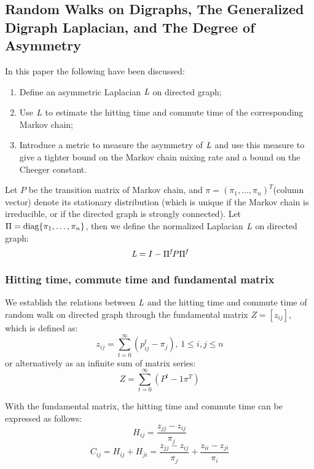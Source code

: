 \documentclass[twoside]{article}
\theoremstyle{definition}
\theoremstyle{definition}
\theoremstyle{remark}
\def\diag{{\rm diag}}
\begin{document}
\subsection{Random Walks on Digraphs, The Generalized Digraph Laplacian, and
The Degree of Asymmetry}
In this paper the following have been discussed:
\begin{enumerate}
  \item Define an asymmetric Laplacian $\emph{L}$ on directed graph;
  \item Use $\emph{L}$ to estimate the hitting time and commute time of the corresponding Markov chain;
  \item Introduce a metric to measure the asymmetry of $\emph{L}$ and use this measure to give a tighter bound on the Markov chain mixing rate and a bound on the Cheeger constant.
\end{enumerate}

Let $P$ be the transition matrix of Markov chain, and $\pi = (\pi_1, \dots, \pi_n)^T$(column vector) denote its stationary distribution (which is unique if the Markov chain is irreducible, or if the directed graph is strongly connected). Let $\Pi = \diag\{\pi_1, \dots, \pi_n\}$, then we define the normalized Laplacian $\emph{L}$ on directed graph:
\begin{equation}\label{E:lap}
   \emph{L} = I - \Pi^\emph{f} P\Pi^\emph{f}
\end{equation}

\subsubsection{Hitting time, commute time and fundamental matrix}
We establish the relations between $\emph{L}$ and the hitting time and commute time of random walk on directed graph through the fundamental matrix $Z = [z_{ij}]$, which is defined as:
\begin{equation}
  z_{ij} = \sum_{t=0}^{\infty} (p_{ij}^{t} - \pi_j) ,\, 1\le i,j\le n
\end{equation}
or alternatively as an infinite sum of matrix series:
\begin{equation}\label{E:Z}
  Z = \sum_{t=0}^\infty (P^t - 1 \pi^T)
\end{equation}

With the fundamental matrix, the hitting time and commute time can be expressed as follows:
\begin{equation}
  H_{ij} = \frac{z_{jj} - z_{ij}}{\pi_j}
\end{equation}
\begin{equation}
  C_{ij} = H_{ij} + H_{ji} = \frac{z_{jj} - z_{ij}}{\pi_j} + \frac{z_{ii} - z_{ji}}{\pi_i}
\end{equation}
\end{document}
